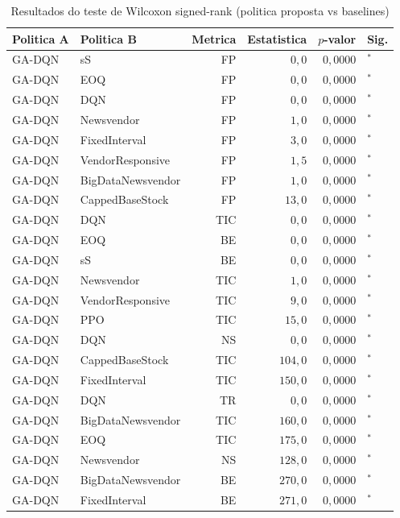 \begin{table}[htb]
\centering
\caption{Resultados do teste de Wilcoxon signed-rank (politica proposta vs baselines)}
\label{tab:wilcoxon}
\begin{tabular}{llrrrl}
\toprule
Politica A & Politica B & Metrica & Estatistica & $p$-valor & Sig. \\
\midrule
GA-DQN & sS & FP & $0{,}0$ & $0{,}0000$ & $^{*}$ \\
GA-DQN & EOQ & FP & $0{,}0$ & $0{,}0000$ & $^{*}$ \\
GA-DQN & DQN & FP & $0{,}0$ & $0{,}0000$ & $^{*}$ \\
GA-DQN & Newsvendor & FP & $1{,}0$ & $0{,}0000$ & $^{*}$ \\
GA-DQN & FixedInterval & FP & $3{,}0$ & $0{,}0000$ & $^{*}$ \\
GA-DQN & VendorResponsive & FP & $1{,}5$ & $0{,}0000$ & $^{*}$ \\
GA-DQN & BigDataNewsvendor & FP & $1{,}0$ & $0{,}0000$ & $^{*}$ \\
GA-DQN & CappedBaseStock & FP & $13{,}0$ & $0{,}0000$ & $^{*}$ \\
GA-DQN & DQN & TIC & $0{,}0$ & $0{,}0000$ & $^{*}$ \\
GA-DQN & EOQ & BE & $0{,}0$ & $0{,}0000$ & $^{*}$ \\
GA-DQN & sS & BE & $0{,}0$ & $0{,}0000$ & $^{*}$ \\
GA-DQN & Newsvendor & TIC & $1{,}0$ & $0{,}0000$ & $^{*}$ \\
GA-DQN & VendorResponsive & TIC & $9{,}0$ & $0{,}0000$ & $^{*}$ \\
GA-DQN & PPO & TIC & $15{,}0$ & $0{,}0000$ & $^{*}$ \\
GA-DQN & DQN & NS & $0{,}0$ & $0{,}0000$ & $^{*}$ \\
GA-DQN & CappedBaseStock & TIC & $104{,}0$ & $0{,}0000$ & $^{*}$ \\
GA-DQN & FixedInterval & TIC & $150{,}0$ & $0{,}0000$ & $^{*}$ \\
GA-DQN & DQN & TR & $0{,}0$ & $0{,}0000$ & $^{*}$ \\
GA-DQN & BigDataNewsvendor & TIC & $160{,}0$ & $0{,}0000$ & $^{*}$ \\
GA-DQN & EOQ & TIC & $175{,}0$ & $0{,}0000$ & $^{*}$ \\
GA-DQN & Newsvendor & NS & $128{,}0$ & $0{,}0000$ & $^{*}$ \\
GA-DQN & BigDataNewsvendor & BE & $270{,}0$ & $0{,}0000$ & $^{*}$ \\
GA-DQN & FixedInterval & BE & $271{,}0$ & $0{,}0000$ & $^{*}$ \\

\end{tabular}
\end{table}
